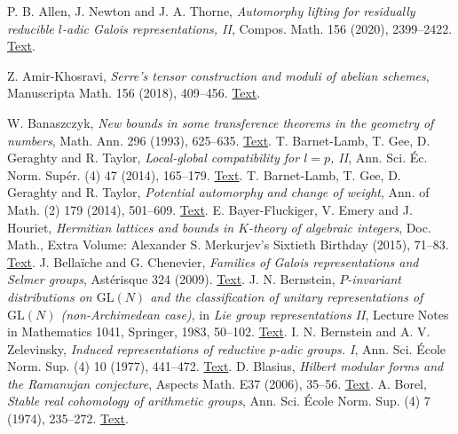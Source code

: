  P. B. Allen, J. Newton and J. A. Thorne, \emph{Automorphy lifting for residually reducible $l$-adic Galois representations, II}, Compos. Math. 156 (2020), 2399--2422. \href{https://doi.org/10.1112/S0010437X20007484}{Text}.
 {\raggedright Z. Amir-Khosravi, \emph{Serre's tensor construction and moduli of abelian schemes}, Manuscripta Math. 156 (2018), 409--456. \href{https://arxiv.org/abs/1507.07607}{Text}.\par}
 W. Banaszczyk, \emph{New bounds in some transference theorems in the geometry of numbers}, Math. Ann. 296 (1993), 625--635. \href{https://doi.org/10.1007/BF01445125}{Text}.
 T. Barnet-Lamb, T. Gee, D. Geraghty and R. Taylor, \emph{Local-global compatibility for $l=p$, II}, Ann. Sci. Éc. Norm. Supér. (4) 47 (2014), 165--179. \href{https://www.numdam.org/item/10.24033/asens.2212.pdf}{Text}.
 T. Barnet-Lamb, T. Gee, D. Geraghty and R. Taylor, \emph{Potential automorphy and change of weight}, Ann. of Math. (2) 179 (2014), 501--609. \href{https://annals.math.princeton.edu/wp-content/uploads/annals-v179-n2-p03-p.pdf}{Text}.
 E. Bayer-Fluckiger, V. Emery and J. Houriet, \emph{Hermitian lattices and bounds in $K$-theory of algebraic integers}, Doc. Math., Extra Volume: Alexander S. Merkurjev's Sixtieth Birthday (2015), 71--83. \href{https://ems.press/content/book-chapter-files/27436}{Text}.
 J. Bella\"iche and G. Chenevier, \emph{Families of Galois representations and Selmer groups}, Astérisque 324 (2009). \href{https://www.numdam.org/item/AST_2009__324__R1_0/}{Text}.
 J. N. Bernstein, \emph{$P$-invariant distributions on $\mathrm{GL}(N)$ and the classification of unitary representations of $\mathrm{GL}(N)$ (non-Archimedean case)}, in \emph{Lie group representations II}, Lecture Notes in Mathematics 1041, Springer, 1983, 50--102. \href{https://www.math.tau.ac.il/~bernstei/Publication_list/publication_texts/Bernstein-P-invar-SLN.pdf}{Text}.
 I. N. Bernstein and A. V. Zelevinsky, \emph{Induced representations of reductive $p$-adic groups. I}, Ann. Sci. École Norm. Sup. (4) 10 (1977), 441--472. \href{https://www.numdam.org/articles/10.24033/asens.1333/}{Text}.
 D. Blasius, \emph{Hilbert modular forms and the Ramanujan conjecture}, Aspects Math. E37 (2006), 35--56. \href{https://arxiv.org/abs/math/0511007}{Text}.
 A. Borel, \emph{Stable real cohomology of arithmetic groups}, Ann. Sci. École Norm. Sup. (4) 7 (1974), 235--272. \href{https://www.numdam.org/articles/10.24033/asens.1269/}{Text}.
